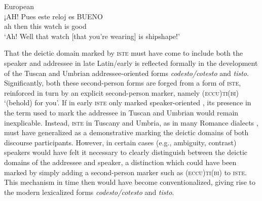 \documentclass[output=paper]{langsci/langscibook}
\begin{document}
\ea \label{bkm:Ref370498717}European  \parencite{Jungbluth:2003a}\\
\gll ¡AH!  Pues  este  reloj  es  BUENO\\
     ah  then  this  watch  is  good\\
\glt \enquote*{Ah! Well that watch [that you’re wearing] is shipshape!}\z

That the deictic domain marked by \textsc{iste} must have come to include both
the speaker and addressee in late Latin/early  is reflected formally in
the development of the Tuscan and Umbrian addressee-oriented forms
\emph{codesto/cotesto} and \emph{tisto}. Significantly, both these
second-person forms are forged from a form of \textsc{iste,} reinforced in turn
by an explicit second-person marker, namely \textsc{(eccu)ti(bi)} ‘(behold) for
you’. If in early  \textsc{iste} only marked speaker-oriented ,
its presence in the term used to mark the addressee in Tuscan and Umbrian would
remain inexplicable. Instead, \textsc{iste} in Tuscany and Umbria, as in many
Romance dialects \citep{ledgeway2004sviluppo}, must have generalized as a
demonstrative marking the deictic domains of both discourse participants.
However, in certain cases (e.g., ambiguity, contrast) speakers would have felt
it necessary to clearly distinguish between the deictic domains of the
addressee and speaker, a distinction which could have been marked by simply
adding a second-person marker such as \textsc{(eccu)ti(bi)} to \textsc{iste}.
This mechanism in time then would have become conventionalized, giving rise to
the modern lexicalized forms \emph{codesto/cotesto} and \emph{tisto}.
\end{document}
